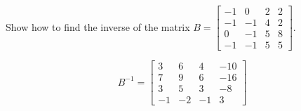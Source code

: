 
\begin{exerciseStatement}


Show how to find the inverse of the matrix \(B= \left[\begin{array}{cccc}
-1 & 0 & 2 & 2 \\
-1 & -1 & 4 & 2 \\
0 & -1 & 5 & 8 \\
-1 & -1 & 5 & 5
\end{array}\right] \).


\end{exerciseStatement}
    
\begin{exerciseAnswer} 
\[B^{-1}= \left[\begin{array}{cccc}
3 & 6 & 4 & -10 \\
7 & 9 & 6 & -16 \\
3 & 5 & 3 & -8 \\
-1 & -2 & -1 & 3
\end{array}\right] \]
\end{exerciseAnswer}
    
